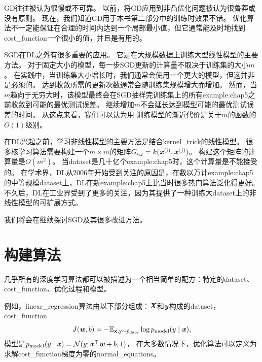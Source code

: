\gls{GD}往往被认为很慢或不可靠。
以前，将\gls{GD}应用到非凸优化问题被认为很鲁莽或没有原则。
现在，我们知道\gls{GD}用于本书第二部分中的训练时效果不错。
优化算法不一定能保证在合理的时间内达到一个局部最小值，但它通常能及时地找到\gls{cost_function}一个很小的值，并且是有用的。


\gls{SGD}在\gls{DL}之外有很多重要的应用。
它是在大规模数据上训练大型线性模型的主要方法。
对于固定大小的模型，每一步\gls{SGD}更新的计算量不取决于训练集的大小$m$。
在实践中，当训练集大小增长时，我们通常会使用一个更大的模型，但这并非是必须的。
达到收敛所需的更新次数通常会随训练集规模增大而增加。
然而，当$m$趋向于无穷大时，该模型最终会在\gls{SGD}抽样完训练集上的所有\gls{example:chap5}之前收敛到可能的最优测试误差。
继续增加$m$不会延长达到模型可能的最优测试误差的时间。
从这点来看，我们可以认为用\,\,训练模型的渐近代价是关于$m$的函数的$O(1)$级别。

在\gls{DL}兴起之前，学习非线性模型的主要方法是结合\gls{kernel_trick}的线性模型。
很多核学习算法需要构建一个$m\times m$的矩阵$G_{i,j}=k(\boldsymbol{\mathit{x}}^{(i)}, \boldsymbol{\mathit{x}}^{(j)})$。
构建这个矩阵的计算量是$O(m^2)$。
当\gls{dataset}是几十亿个\gls{example:chap5}时，这个计算量是不能接受的。
在学术界，\gls{DL}从2006年开始受到关注的原因是，在数以万计\gls{example:chap5}的中等规模\gls{dataset}上，\gls{DL}在新\gls{example:chap5}上比当时很多热门算法泛化得更好。
不久后，\gls{DL}在工业界受到了更多的关注，因为其提供了一种训练大\gls{dataset}上的非线性模型的可扩展方式。

我们将会在继续探讨\gls{SGD}及其很多改进方法。

\section{构建算法}
\label{sec:building_a_machine_learning_algorithm}
几乎所有的深度学习算法都可以被描述为一个相当简单的配方：特定的\gls{dataset}、\gls{cost_function}、优化过程和模型。

例如，\gls{linear_regression}算法由以下部分组成：$\boldsymbol{\mathit{X}}$和$\boldsymbol{\mathit{y}}$构成的\gls{dataset}，\gls{cost_function}
\begin{equation}
    J(\boldsymbol{\mathit{w}}, b) = -\mathbb{E}_{\mathbf{x},\mathrm{y}\sim\hat{p}_{\text{data}}}
    \log p_{\text{model}} (y \mid \boldsymbol{\mathit{x}}) ,
\end{equation}
模型是$p_{\text{model}} (y \mid \boldsymbol{\mathit{x}}) = \mathcal{N}(y; \boldsymbol{\mathit{x}}^\top \boldsymbol{\mathit{w}} + b, 1)$，
在大多数情况下，优化算法可以定义为求解\gls{cost_function}梯度为零的\gls{normal_equations}。


